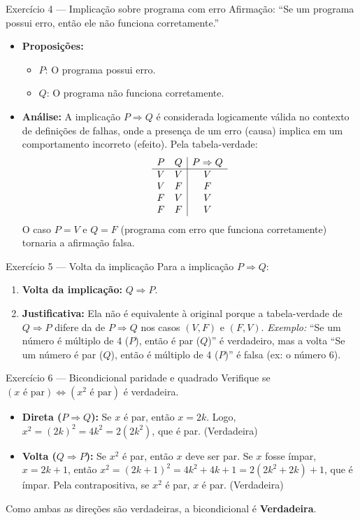 \documentclass[12pt]{article}
\begin{document}
\begin{block}{Exercício 4 — Implicação sobre programa com erro}
Afirmação: ``Se um programa possui erro, então ele não funciona corretamente.''
\begin{itemize}
    \item \textbf{Proposições:}
    \begin{itemize}
        \item $P$: O programa possui erro.
        \item $Q$: O programa não funciona corretamente.
    \end{itemize}
    \item \textbf{Análise:} A implicação $P \Rightarrow Q$ é considerada logicamente válida no contexto de definições de falhas, onde a presença de um erro (causa) implica em um comportamento incorreto (efeito). Pela tabela-verdade:
    \[
    \begin{array}{c c | c}
    P & Q & P \Rightarrow Q \\
    \hline
    V & V & V \\
    V & F & F \\
    F & V & V \\
    F & F & V
    \end{array}
    \]
    O caso $P=V$ e $Q=F$ (programa com erro que funciona corretamente) tornaria a afirmação falsa.
\end{itemize}
\end{block}

\begin{block}{Exercício 5 — Volta da implicação}
Para a implicação $P \Rightarrow Q$:
\begin{enumerate}
    \item \textbf{Volta da implicação:} $Q \Rightarrow P$.
    \item \textbf{Justificativa:} Ela não é equivalente à original porque a tabela-verdade de $Q \Rightarrow P$ difere da de $P \Rightarrow Q$ nos casos $(V,F)$ e $(F,V)$. \textit{Exemplo:} ``Se um número é múltiplo de 4 ($P$), então é par ($Q$)'' é verdadeiro, mas a volta ``Se um número é par ($Q$), então é múltiplo de 4 ($P$)'' é falsa (ex: o número 6).
\end{enumerate}
\end{block}

\begin{block}{Exercício 6 — Bicondicional paridade e quadrado}
Verifique se $(x \text{ é par}) \Leftrightarrow (x^2 \text{ é par})$ é verdadeira.
\begin{itemize}
    \item \textbf{Direta ($P \Rightarrow Q$):} Se $x$ é par, então $x = 2k$. Logo, $x^2 = (2k)^2 = 4k^2 = 2(2k^2)$, que é par. (Verdadeira)
    \item \textbf{Volta ($Q \Rightarrow P$):} Se $x^2$ é par, então $x$ deve ser par. Se $x$ fosse ímpar, $x = 2k+1$, então $x^2 = (2k+1)^2 = 4k^2 + 4k + 1 = 2(2k^2 + 2k) + 1$, que é ímpar. Pela contrapositiva, se $x^2$ é par, $x$ é par. (Verdadeira)
\end{itemize}
Como ambas as direções são verdadeiras, a bicondicional é \textbf{Verdadeira}.
\end{block}
\end{document}
